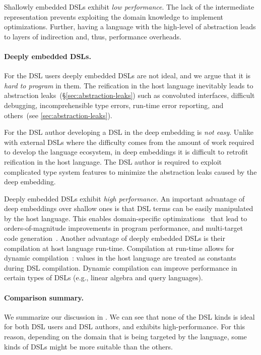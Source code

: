 Shallowly embedded DSLs exhibit \emph{low performance}. The lack of the intermediate representation
prevents exploiting the domain knowledge to implement optimizations. Further, having
a language with the high-level of abstraction leads to layers of indirection and, thus,
performance overheads.

\paragraph{Deeply embedded DSLs.} For the DSL users deeply embedded DSLs are not ideal,
 and we argue that it is \emph{hard to program} in them. The reification in the host language
 inevitably leads to abstraction leaks~(\S \ref{sec:abstraction-leaks}) such as
 convoluted interfaces, difficult debugging, incomprehensible type errors, run-time error reporting,
 and others~(see \ref{sec:abstraction-leaks}).

For the DSL author developing a DSL in the deep embedding is \emph{not easy}. Unlike with
 external DSLs where the difficulty comes from the amount of work required to develop
 the language ecosystem, in deep embeddings it is difficult to retrofit reification
 in the host language. The DSL author is required to exploit complicated type system features to
 minimize the abstraction leaks caused by the deep embedding.

Deeply embedded DSLs exhibit \emph{high performance}. An important advantage of deep
  embeddings over shallow ones is that DSL terms can be easily manipulated by the
  host language. This enables domain-specific optimizations~\cite{rompf2012lightweight,rompf_optimizing_2013}
  that lead to orders-of-magnitude improvements in program performance, and
  multi-target code generation~\cite{brown_heterogeneous_2011}. Another advantage of deeply embedded DSLs is their  compilation at host language run-time. Compilation at run-time allows for dynamic compilation~\cite{auslander1996fast,grant2000dyc}: values in the host language are treated as constants during DSL compilation. Dynamic compilation
  can improve performance in certain types of DSLs (e.g., linear algebra and query languages).


\paragraph{Comparison summary.} We summarize our discussion in .
 We can see that none of the DSL kinds is ideal for both DSL users and DSL authors,
 and exhibits high-performance. For this reason, depending on the domain that is being targeted by
 the language, some kinds of DSLs might be more suitable than the others.

